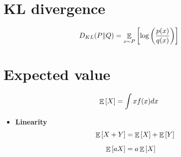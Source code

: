 \documentclass{article}
\begin{document}


\section{KL divergence}
\begin{align*}
  D_{KL} (P \| Q) = \mathop{{\mathbb E}}_{x \sim P} \left[  { \log \left( \dfrac{p(x)}{q(x)} \right) } \right]
\end{align*}

\section{Expected value}
\begin{align*}
  \mathop{{\mathbb E}}_{} \left[ X \right] = \int x f(x) dx
\end{align*}
\begin{itemize}
  \item \textbf{Linearity}
  \begin{align*}
    \mathop{{\mathbb E}}_{} \left[ X + Y \right] &= \mathop{{\mathbb E}}_{} \left[ X \right] + \mathop{{\mathbb E}}_{} \left[ Y \right] \\
    \mathop{{\mathbb E}}_{} \left[ a X \right] &= a \mathop{{\mathbb E}}_{} \left[ X \right]
  \end{align*}
\end{itemize}
\end{document}
